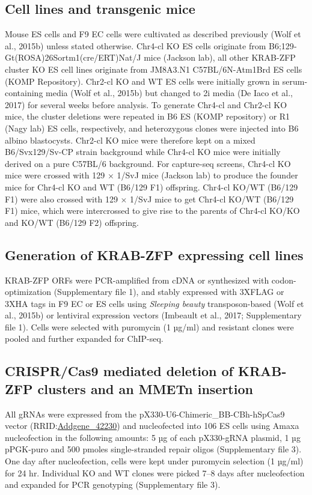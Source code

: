 \documentclass[11pt,a4paper]{article}
\begin{document}
\subsection{Cell lines and transgenic mice}

Mouse ES cells and F9 EC cells were cultivated as described previously (Wolf et al., 2015b) unless stated otherwise. Chr4-cl KO ES cells originate from B6;129‐ Gt(ROSA)26Sortm1(cre/ERT)Nat/J mice (Jackson lab), all other KRAB-ZFP cluster KO ES cell lines originate from JM8A3.N1 C57BL/6N-Atm1Brd ES cells (KOMP Repository). Chr2-cl KO and WT ES cells were initially grown in serum-containing media (Wolf et al., 2015b) but changed to 2i media (De Iaco et al., 2017) for several weeks before analysis. To generate Chr4-cl and Chr2-cl KO mice, the cluster deletions were repeated in B6 ES (KOMP repository) or R1 (Nagy lab) ES cells, respectively, and heterozygous clones were injected into B6 albino blastocysts. Chr2-cl KO mice were therefore kept on a mixed B6/Svx129/Sv-CP strain background while Chr4-cl KO mice were initially derived on a pure C57BL/6 background. For capture-seq screens, Chr4-cl KO mice were crossed with 129 × 1/SvJ mice (Jackson lab) to produce the founder mice for Chr4-cl KO and WT (B6/129 F1) offspring. Chr4-cl KO/WT (B6/129 F1) were also crossed with 129 × 1/SvJ mice to get Chr4-cl KO/WT (B6/129 F1) mice, which were intercrossed to give rise to the parents of Chr4-cl KO/KO and KO/WT (B6/129 F2) offspring.

\subsection{Generation of KRAB-ZFP expressing cell lines}

KRAB-ZFP ORFs were PCR-amplified from cDNA or synthesized with codon-optimization (Supplementary file 1), and stably expressed with 3XFLAG or 3XHA tags in F9 EC or ES cells using \textit{Sleeping beauty} transposon-based (Wolf et al., 2015b) or lentiviral expression vectors (Imbeault et al., 2017; Supplementary file 1). Cells were selected with puromycin (1 µg/ml) and resistant clones were pooled and further expanded for ChIP-seq.

\subsection{CRISPR/Cas9 mediated deletion of KRAB-ZFP clusters and an MMETn insertion}

All gRNAs were expressed from the pX330-U6-Chimeric\_BB-CBh-hSpCas9 vector (RRID:\href{https://scicrunch.org/resolver/Addgene\_42230}{Addgene\_42230}) and nucleofected into 106 ES cells using Amaxa nucleofection in the following amounts: 5 µg of each pX330-gRNA plasmid, 1 µg pPGK-puro and 500 pmoles single-stranded repair oligos (Supplementary file 3). One day after nucleofection, cells were kept under puromycin selection (1 µg/ml) for 24 hr. Individual KO and WT clones were picked 7–8 days after nucleofection and expanded for PCR genotyping (Supplementary file 3).
\end{document}
